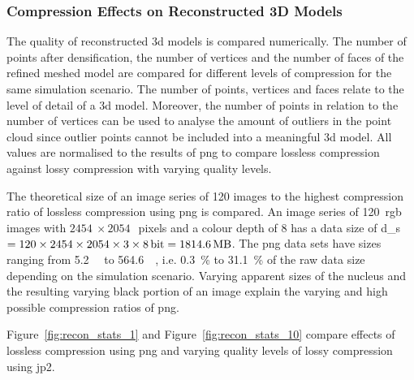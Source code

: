 
\subsubsection{Compression Effects on Reconstructed 3D Models}
The quality of  reconstructed \gls{3d} models is compared numerically. The number of points after densification, the number of vertices and the number of faces of the refined meshed model are compared for different levels of compression for the same simulation scenario. The number of points, vertices and faces relate to the level of detail of a \gls{3d} model. Moreover, the number of points in relation to the number of vertices can be used to analyse the amount of outliers in the point cloud since outlier points cannot be included into a meaningful \gls{3d} model. All values are normalised to the results of \gls{png} to compare lossless compression against lossy compression with varying quality levels.

The theoretical size of an image series of \SI{120}{} images to the highest compression ratio of lossless compression using \gls{png} is compared. An image series of \SI{120}{}~\gls{rgb} images with $\SI{2454}{} \times \SI{2054}{}$~pixels and a colour depth of \SI{8}{\bit} has a data size of \gls{d_s}$ = 120 \times 2454 \times 2054 \times 3 \times \SI{8}{\bit} = \SI{1814.6}{\mega\byte}$. The \gls{png} data sets have sizes ranging from \SI{5.2}{\mega\byte} to \SI{564.6}{\mega\byte}, i.e. \SI{0.3}{\percent} to \SI{31.1}{\percent} of the raw data size depending on the simulation scenario. Varying apparent sizes of the nucleus and the resulting varying black portion of an image explain the varying and high possible compression ratios of \gls{png}.

Figure~\ref{fig:recon_stats_1} and Figure~\ref{fig:recon_stats_10} compare effects of lossless compression using \gls{png} and varying quality levels of lossy compression using \gls{jp2}.

